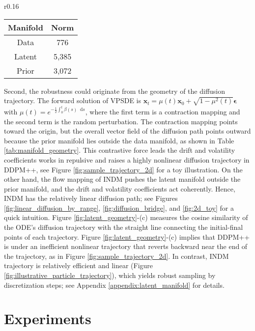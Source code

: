 \documentclass{article}
\theoremstyle{definition}
\theoremstyle{remark}
\newcommand*\diff{\mathop{}\!\mathrm{d}}
\begin{document}
	\begin{wraptable}{r}{0.16\textwidth}
		\vskip -0.05in
		\caption{Average $L_{2}^{2}$ Norm.}
		\label{tab:manifold_geometry}
		\vskip -0.05in
		\tiny
		\centering
		\begin{tabular}{cc}
			\toprule
			Manifold & Norm \\\midrule
			Data & 776 \\
			Latent & 5,385\\
			Prior & 3,072\\
			\bottomrule
		\end{tabular}
		\vskip -0.2in
	\end{wraptable}
	Second, the robustness could originate from the geometry of the diffusion trajectory. The forward solution of VPSDE is $\mathbf{x}_{t}=\mu(t)\mathbf{x}_{0}+\sqrt{1-\mu^{2}(t)}\bm{\epsilon}$ with $\mu(t)=e^{-\frac{1}{2}\int_{0}^{t}\beta(s)\diff s}$, where the first term is a contraction mapping and the second term is the random perturbation. The contraction mapping points toward the origin, but the overall vector field of the diffusion path points outward because the prior manifold lies outside the data manifold, as shown in Table \ref{tab:manifold_geometry}. This contrastive force leads the drift and volatility coefficients works in repulsive and raises a highly nonlinear diffusion trajectory in DDPM++, see Figure \ref{fig:sample_trajectory_2d} for a toy illustration. On the other hand, the flow mapping of INDM pushes the latent manifold outside the prior manifold, and the drift and volatility coefficients act coherently. Hence, INDM has the relatively linear diffusion path; see Figures \ref{fig:linear_diffusion_by_range}, \ref{fig:diffusion_bridge}, and \ref{fig:2d_toy} for a quick intuition. Figure \ref{fig:latent_geometry}-(c) measures the cosine similarity of the ODE's diffusion trajectory with the straight line connecting the initial-final points of each trajectory. Figure \ref{fig:latent_geometry}-(c) implies that DDPM++ is under an inefficient nonlinear trajectory that reverts backward near the end of the trajectory, as in Figure \ref{fig:sample_trajectory_2d}. In contrast, INDM trajectory is relatively efficient and linear (Figure \ref{fig:illustrative_particle_trajectory}), which yields robust sampling by discretization steps; see Appendix \ref{appendix:latent_manifold} for details.
	
	\section{Experiments}\label{sec:experiments}
	
\end{document}

